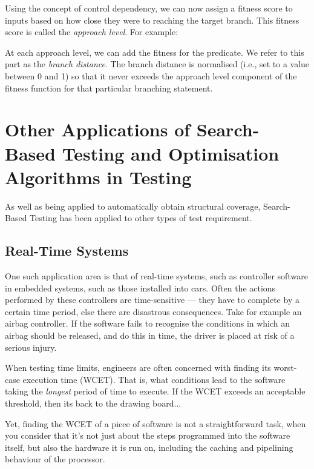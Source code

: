 Using the concept of control dependency, we can now assign a fitness score to
inputs based on how close they were to reaching the target branch. This fitness
score is called the {\it approach level}. For example:


At each approach level, we can add the fitness for the predicate. We refer to
this part as the {\it branch distance}. The branch distance is normalised
(i.e., set to a value between 0 and 1) so that it never exceeds the approach
level component of the fitness function for that particular branching statement.




\section{Other Applications of Search-Based Testing and Optimisation Algorithms
in Testing}

As well as being applied to automatically obtain structural coverage,
Search-Based Testing has been applied to other types of test requirement.

\subsection{Real-Time Systems}

One such application area is that of real-time systems, such as controller
software in embedded systems, such as those installed into cars. Often the
actions performed by these controllers are time-sensitive --- they have to
complete by a certain time period, else there are disastrous consequences. Take
for example an airbag controller. If the software fails to recognise the
conditions in which an airbag should be released, and do this in time, the
driver is placed at risk of a serious injury. 

When testing time limits, engineers are often concerned with finding its
worst-case execution time (WCET). That is, what conditions lead to the software
taking the {\it longest} period of time to execute. If the WCET exceeds an
acceptable threshold, then its back to the drawing board...

Yet, finding the WCET of a piece of software is not a straightforward task, when
you consider that it's not just about the steps programmed into the software
itself, but also the hardware it is run on, including the caching and pipelining
behaviour of the processor. 

